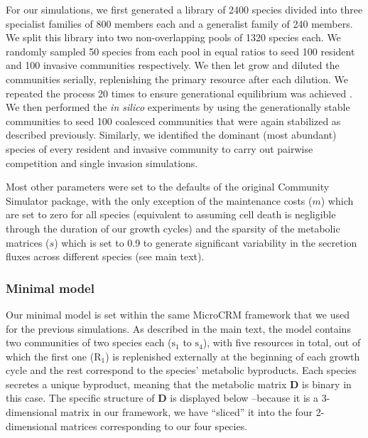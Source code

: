 \documentclass[a4paper,10pt]{article}
\begin{document}
For our simulations,
we first generated a library of 2400 species divided into three specialist
families of 800 members each
and a generalist family of 240 members.
We split this library into two non-overlapping pools of 1320 species each.
We randomly sampled 50 species from each pool in equal ratios to seed
100 resident and
100 invasive communities respectively.
We then let grow and diluted the communities serially,
replenishing the primary
resource after each dilution.
We repeated the process 20 times to ensure generational equilibrium was
achieved \cite{Goldford2018}.
We then performed the \textit{in silico} experiments by using the
generationally stable communities to seed 100 coalesced communities
that were again stabilized as described previously.
Similarly, we identified the dominant (most
abundant) species of every resident and invasive community to carry out pairwise
competition and single invasion simulations.

Most other parameters were set to the defaults of the original Community Simulator
package, with the only exception of the maintenance costs ($m$) which are set to
zero for all species
(equivalent to assuming cell death is negligible through the duration of our growth cycles)
and the sparsity of the metabolic matrices ($s$) which is set to 0.9
to generate significant variability in the secretion fluxes across different species
(see main text).

\subsubsection*{Minimal model}\label{methods:sim-min}

Our minimal model is set within the same MicroCRM framework that we used
for the previous simulations.
As described in the main text, the model contains two communities
of two species each
($\mathrm{s}_1$ to $\mathrm{s}_4$),
with five resources in total, out of which the first one ($\mathrm{R}_1$)
is replenished externally at the beginning of each growth cycle
and the rest correspond to the species' metabolic byproducts.
Each species secretes a unique byproduct, meaning that the metabolic
matrix $\mathbf{D}$ is binary in this case.
The specific structure of $\mathbf{D}$ is displayed below
--because it is a 3-dimensional matrix in our framework,
we have ``sliced'' it into the four 2-dimensional matrices corresponding to
our four species.
\end{document}
